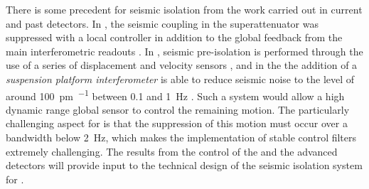 There is some precedent for seismic isolation from the work carried out in current and past detectors. In \VIRGO{}, the seismic coupling in the superattenuator was suppressed with a local controller in addition to the global feedback from the main interferometric readouts \cite{Acernese2004}. In \ALIGO{}, seismic pre-isolation is performed through the use of a series of displacement and velocity sensors \cite{Stochino2009}, and in the \AEIPROTOTYPE{} the addition of a \emph{suspension platform interferometer} \cite{Gossler2010} is able to reduce seismic noise to the level of around \SI{100}{\pico\meter\per\sqrthz} between \num{0.1} and \SI{1}{\hertz} \cite{Dahl2010}. Such a system would allow a high dynamic range global sensor to control the remaining motion. The particularly challenging aspect for \ETLF{} is that the suppression of this motion must occur over a bandwidth below \SI{2}{\hertz}, which makes the implementation of stable control filters extremely challenging. The results from the control of the \AEIPROTOTYPE{} and the advanced detectors will provide input to the technical design of the seismic isolation system for \ETLF{}.